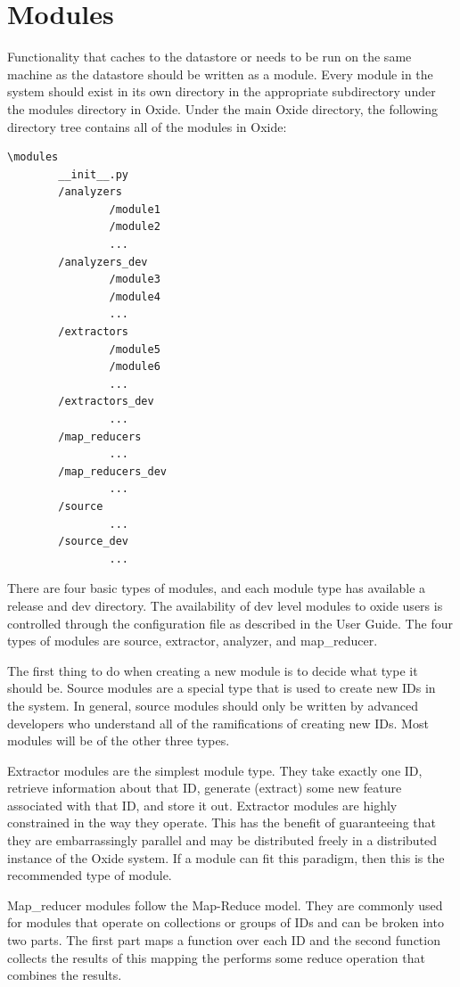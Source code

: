 \documentclass{book}
\begin{document}
\chapter{Modules}
Functionality that caches to the datastore or needs to be run on the same machine as the datastore should be written as a module.  Every module in the system should exist in its own directory in the appropriate subdirectory under the modules directory in Oxide.  Under the main Oxide directory, the following directory tree contains all of the modules in Oxide:
\begin{verbatim}\modules
        __init__.py
        /analyzers
                /module1
                /module2
                ...
        /analyzers_dev
                /module3
                /module4 
                ...
        /extractors
                /module5
                /module6
                ...
        /extractors_dev
                ...
        /map_reducers
                ...
        /map_reducers_dev
                ...
        /source
                ...
        /source_dev
                ...
\end{verbatim}

There are four basic types of modules, and each module type has available a release and dev directory.  The availability of dev level modules to oxide users is controlled through the configuration file as described in the User Guide.  The four types of modules are source, extractor, analyzer, and map\_reducer. 

The first thing to do when creating a new module is to decide what type it should be.  Source modules are a special type that is used to create new IDs in the system.  In general, source modules should only be written by advanced developers who understand all of the ramifications of creating new IDs.  Most modules will be of the other three types.

Extractor modules are the simplest module type.  They take exactly one ID, retrieve information about that ID, generate (extract) some new feature associated with that ID, and store it out.  Extractor modules are highly constrained in the way they operate.  This has the benefit of guaranteeing that they are embarrassingly parallel and may be distributed freely in a distributed instance of the Oxide system.  If a module can fit this paradigm, then this is the recommended type of module.

Map\_reducer modules follow the Map-Reduce model.  They are commonly used for modules that operate on collections or groups of IDs and can be broken into two parts.  The first part maps a function over each ID and the second function collects the results of this mapping the performs some reduce operation that combines the results.  
\end{document}
